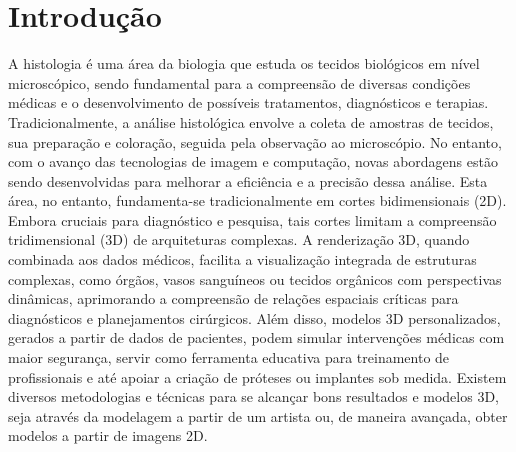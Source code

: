 \section{Introdução}
\label{sec:introducao}

A histologia é uma área da biologia que estuda os tecidos biológicos em nível microscópico, sendo fundamental para a compreensão de diversas condições médicas e o desenvolvimento de possíveis tratamentos, diagnósticos e terapias. Tradicionalmente, a análise histológica envolve a coleta de amostras de tecidos, sua preparação e coloração, seguida pela observação ao microscópio. No entanto, com o avanço das tecnologias de imagem e computação, novas abordagens estão sendo desenvolvidas para melhorar a eficiência e a precisão dessa análise. Esta área, no entanto, fundamenta-se tradicionalmente em cortes bidimensionais (2D). Embora cruciais para diagnóstico e pesquisa, tais cortes limitam a compreensão tridimensional (3D) de arquiteturas complexas. A renderização 3D, quando combinada aos dados médicos, facilita a visualização integrada de estruturas complexas, como órgãos, vasos sanguíneos ou tecidos orgânicos com perspectivas dinâmicas, aprimorando a compreensão de relações espaciais críticas para diagnósticos e planejamentos cirúrgicos. Além disso, modelos 3D personalizados, gerados a partir de dados de pacientes, podem simular intervenções médicas com maior segurança, servir como ferramenta educativa para treinamento de profissionais e até apoiar a criação de próteses ou implantes sob medida. Existem diversos metodologias e técnicas para se alcançar bons resultados e modelos 3D, seja através da modelagem a partir de um artista ou, de maneira avançada, obter modelos a partir de imagens 2D.

